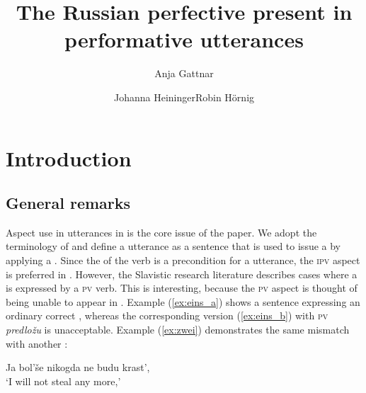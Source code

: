 \documentclass[output=paper,colorlinks,citecolor=brown,newtxmath,hidelinks]{langscibook}
\title{The Russian perfective present in performative utterances}
\author{Anja Gattnar\affiliation{University of Tübingen}\and  Johanna Heininger\affiliation{University of Tübingen}\lastand  Robin Hörnig\affiliation{University of Tübingen}}
\begin{document}
\maketitle
{}
%

\section{Introduction}

\subsection{General remarks}
Aspect use in  utterances in  is the core issue of the  paper. We adopt the terminology of \citet{Eckardt2012} and define a  utterance as a sentence that is used to issue a  by applying a . Since the  of the verb is a precondition for a  utterance, the \textsc{ipv}  aspect is preferred in . However, the Slavistic research literature describes cases where a  is expressed by a \textsc{pv} verb. This is interesting, because the \textsc{pv} aspect is thought of being unable to appear in . Example (\ref{ex:eins_a}) shows a sentence expressing an ordinary correct , whereas the corresponding version (\ref{ex:eins_b}) with \textsc{pv} \textit{predložu} is unacceptable. Example (\ref{ex:zwei}) demonstrates the same mismatch with another :

\ea\label{ex:eins}
           \z
\z

\ea\label{ex:zwei} Ja bol’še nikogda ne budu krast',\\‘I will not steal any more,’
           \z
\z
\end{document}
